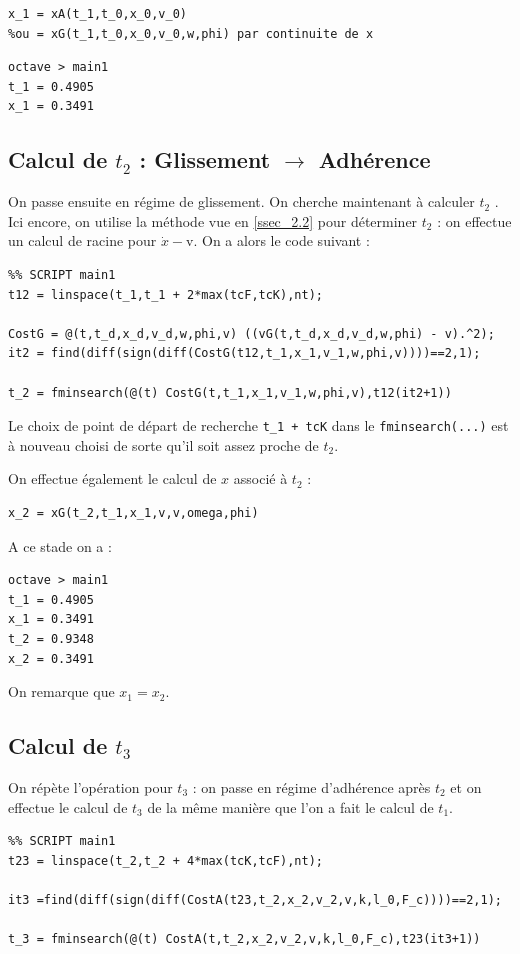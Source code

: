 \documentclass{article}
\begin{document}
\begin{lstlisting}
x_1 = xA(t_1,t_0,x_0,v_0) 
%ou = xG(t_1,t_0,x_0,v_0,w,phi) par continuite de x
\end{lstlisting}


\begin{lstlisting}
octave > main1
t_1 = 0.4905
x_1 = 0.3491
\end{lstlisting}


\subsection{Calcul de $t_2$ : Glissement $\rightarrow$ Adhérence}
On passe ensuite en régime de glissement. On cherche maintenant à calculer $t_2$ . Ici encore, on utilise la méthode vue en \ref{ssec_2.2} pour déterminer $t_2$ : on effectue un calcul de racine pour $\dot{x}-\text{v}$. On a alors le code suivant :

\begin{lstlisting}
%% SCRIPT main1
t12 = linspace(t_1,t_1 + 2*max(tcF,tcK),nt);

CostG = @(t,t_d,x_d,v_d,w,phi,v) ((vG(t,t_d,x_d,v_d,w,phi) - v).^2);
it2 = find(diff(sign(diff(CostG(t12,t_1,x_1,v_1,w,phi,v))))==2,1);

t_2 = fminsearch(@(t) CostG(t,t_1,x_1,v_1,w,phi,v),t12(it2+1))
\end{lstlisting}

Le choix de point de départ de recherche \verb|t_1 + tcK| dans le \verb|fminsearch(...)| est à nouveau choisi de sorte qu'il soit assez proche de $t_2$. 

On effectue également le calcul de $x$ associé à $t_2$ :

\begin{lstlisting}
x_2 = xG(t_2,t_1,x_1,v,v,omega,phi)
\end{lstlisting}

A ce stade on a :

\begin{lstlisting}
octave > main1
t_1 = 0.4905
x_1 = 0.3491
t_2 = 0.9348
x_2 = 0.3491
\end{lstlisting}

On remarque que $x_1=x_2$.

\subsection{Calcul de $t_3$}
On répète l'opération pour $t_3$ : on passe en régime d'adhérence après $t_2$ et on effectue le calcul de $t_3$  de la même manière que l'on a fait le calcul de $t_1$. 
\begin{lstlisting}
%% SCRIPT main1
t23 = linspace(t_2,t_2 + 4*max(tcK,tcF),nt);

it3 =find(diff(sign(diff(CostA(t23,t_2,x_2,v_2,v,k,l_0,F_c))))==2,1);

t_3 = fminsearch(@(t) CostA(t,t_2,x_2,v_2,v,k,l_0,F_c),t23(it3+1))
\end{lstlisting}
 
\end{document}
